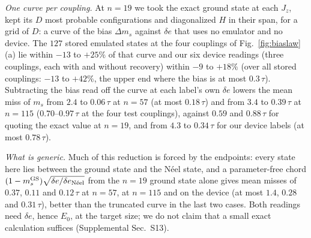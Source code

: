 \documentclass[aps,prx,twocolumn,10pt,superscriptaddress,nofootinbib,longbibliography,floatfix]{revtex4-2}
\theoremstyle{remark}
\newcommand{\Jz}{J_z}
\newcommand{\ms}{m_s}
\newcommand{\de}{\delta e}
\begin{document}
\emph{One curve per coupling.} At $n=19$ we took the exact ground state at each $\Jz$, kept its $D$ most probable %
configurations and diagonalized $H$ in their span, for a grid of $D$: a curve of the bias $\Delta\ms$ against $\de$
that uses no emulator and no device. The $127$ stored emulated states at the four couplings of Fig.~\ref{fig:biaslaw}(a) lie within %
$-13$ to $+25\%$ of that curve and our six device readings (three couplings, each with and without recovery) %
within $-9$ to $+18\%$ (over all stored couplings: $-13$ %
to $+42\%$, the upper end where the bias is at most $0.3\,\tau$). Subtracting the bias read off the curve at each %
label's own $\de$ lowers the mean miss of $\ms$ from $2.4$ to $0.06\,\tau$ at $n=57$ (at most $0.18\,\tau$) and from %
$3.4$ to $0.39\,\tau$ at $n=115$ ($0.70$--$0.97\,\tau$ at the four test couplings), against $0.59$ and $0.88\,\tau$ %
for quoting the exact value at $n=19$, and from $4.3$ to $0.34\,\tau$ for our device labels (at most $0.78\,\tau$). %

\emph{What is generic.} Much of this reduction is forced by the endpoints: every state here lies between the ground
state and the N\'eel state, and a parameter-free chord $(1-m_s^{\rm GS})\sqrt{\de/\de_{\text{N\'eel}}}$ from the
$n=19$ ground state alone gives mean misses of $0.37$, $0.11$ and $0.12\,\tau$ at $n=57$, at $n=115$ and on the %
device (at most $1.4$, $0.28$ and $0.31\,\tau$), better than the truncated curve in the last two cases. Both readings %
need $\de$, hence $E_0$, at the target size; we do not claim that a small exact calculation suffices (Supplemental
Sec.~S13).
\end{document}
